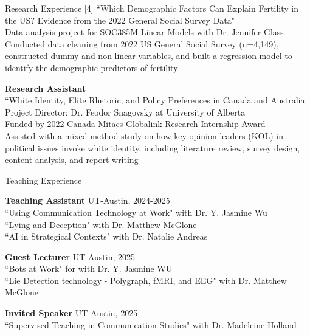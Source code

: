 \documentclass[
	11pt, %
]{resume} %
\begin{document}
\begin{rSection}{Research Experience}
  \textnormal{[4]} “Which Demographic Factors Can Explain Fertility in the US? Evidence from the 2022 General Social Survey Data"\\
\textbullet\enspace Data analysis project for SOC385M Linear Models with Dr. Jennifer Glass\\    
\textbullet\enspace Conducted data cleaning from 2022 US General Social Survey (n=4,149), constructed dummy and non-linear variables, and built a regression model to identify the demographic predictors of fertility

    \textbf{Research Assistant}\\ 
     “White Identity, Elite Rhetoric, and Policy Preferences in Canada and Australia\\
\textbullet\enspace Project Director: Dr. Feodor Snagovsky at University of Alberta\\    
\textbullet\enspace Funded by 2022 Canada Mitacs Globalink Research Internship Award\\
\textbullet\enspace Assisted with a mixed-method study on how key opinion leaders (KOL) in political issues invoke white identity, including literature review, survey design, content analysis, and report writing\\


	
\end{rSection}




\begin{rSection}{Teaching Experience}

    \textbf{Teaching Assistant} \hfill UT-Austin, 2024-2025\\
\textbullet\enspace “Using Communication Technology at Work" with Dr. Y. Jasmine Wu\\
\textbullet\enspace “Lying and Deception" with Dr. Matthew McGlone\\
\textbullet\enspace “AI in Strategical Contexts" with Dr. Natalie Andreas 
    
    \textbf{Guest Lecturer} \hfill UT-Austin, 2025\\
\textbullet\enspace “Bots at Work" for with Dr. Y. Jasmine WU\\
\textbullet\enspace “Lie Detection technology - Polygraph, fMRI, and EEG" with Dr. Matthew McGlone

    \textbf{Invited Speaker} \hfill UT-Austin, 2025\\
\textbullet\enspace “Supervised Teaching in Communication Studies" with Dr. Madeleine Holland 




\end{rSection}
\end{document}
